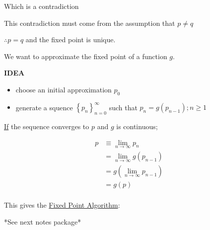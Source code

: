 Which is a contradiction

This contradiction must come from the assumption that $p \ne q$

$\therefore p = q$ and the fixed point is unique.

We want to approximate the fixed point of a function $g$.

\textbf{IDEA}

\begin{itemize}
\item choose an initial approximation $p_0$
\item generate a squence $\displaystyle \left\{ p_n \right\}_{n=0}^\infty$
  such that $p_n = g(p_{n-1}); n \geq 1$
\end{itemize}

\uline{If} the sequence converges to $p$ and $g$ is continuous;

\begin{align*}
  p &\equiv \lim_{n\to\infty} p_n \\
  &= \lim_{n\to\infty} g(p_{n-1}) \\
  &=  g(\lim_{n\to\infty} p_{n-1}) \\
  &= g(p) \\
\end{align*}

This gives the \uline{Fixed Point Algorithm}:

*See next notes package*

